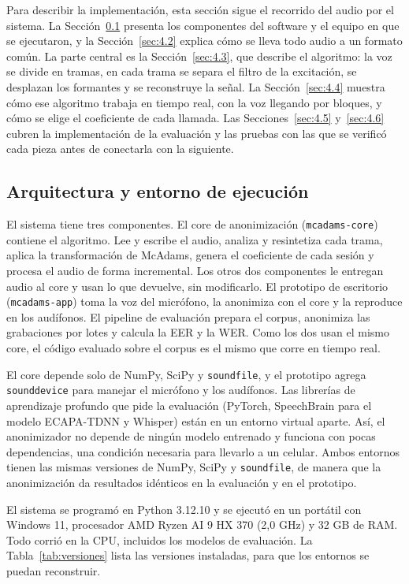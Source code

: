\documentclass[10pt,twocolumn]{article}
\begin{document}
Para describir la implementación, esta sección sigue el recorrido del audio por el sistema. La Sección~\ref{sec:4.1} presenta los componentes del software y el equipo en que se ejecutaron, y la Sección~\ref{sec:4.2} explica cómo se lleva todo audio a un formato común. La parte central es la Sección~\ref{sec:4.3}, que describe el algoritmo: la voz se divide en tramas, en cada trama se separa el filtro de la excitación, se desplazan los formantes y se reconstruye la señal. La Sección~\ref{sec:4.4} muestra cómo ese algoritmo trabaja en tiempo real, con la voz llegando por bloques, y cómo se elige el coeficiente de cada llamada. Las Secciones~\ref{sec:4.5} y~\ref{sec:4.6} cubren la implementación de la evaluación y las pruebas con las que se verificó cada pieza antes de conectarla con la siguiente.

\subsection{Arquitectura y entorno de ejecución}\label{sec:4.1}

El sistema tiene tres componentes. El core de anonimización (\texttt{mcadams-core}) contiene el algoritmo. Lee y escribe el audio, analiza y resintetiza cada trama, aplica la transformación de McAdams, genera el coeficiente de cada sesión y procesa el audio de forma incremental. Los otros dos componentes le entregan audio al core y usan lo que devuelve, sin modificarlo. El prototipo de escritorio (\texttt{mcadams-app}) toma la voz del micrófono, la anonimiza con el core y la reproduce en los audífonos. El pipeline de evaluación prepara el corpus, anonimiza las grabaciones por lotes y calcula la EER y la WER. Como los dos usan el mismo core, el código evaluado sobre el corpus es el mismo que corre en tiempo real.

El core depende solo de NumPy, SciPy y \texttt{soundfile}, y el prototipo agrega \texttt{sounddevice} para manejar el micrófono y los audífonos. Las librerías de aprendizaje profundo que pide la evaluación (PyTorch, SpeechBrain para el modelo ECAPA-TDNN y Whisper) están en un entorno virtual aparte. Así, el anonimizador no depende de ningún modelo entrenado y funciona con pocas dependencias, una condición necesaria para llevarlo a un celular. Ambos entornos tienen las mismas versiones de NumPy, SciPy y \texttt{soundfile}, de manera que la anonimización da resultados idénticos en la evaluación y en el prototipo.

El sistema se programó en Python 3.12.10 y se ejecutó en un portátil con Windows 11, procesador AMD Ryzen AI 9 HX 370 (2,0 GHz) y 32 GB de RAM. Todo corrió en la CPU, incluidos los modelos de evaluación. La Tabla~\ref{tab:versiones} lista las versiones instaladas, para que los entornos se puedan reconstruir.
\end{document}
